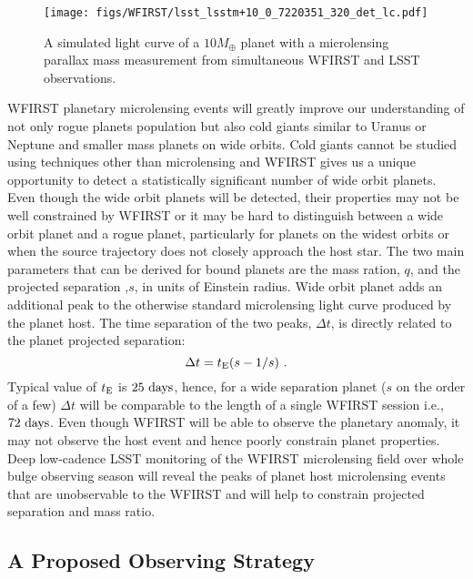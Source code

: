 \begin{figure}[t]
\centering\texttt{[image: figs/WFIRST/lsst\_lsstm+10\_0\_7220351\_320\_det\_lc.pdf]}
\caption{A simulated light curve of a $10 M_{\oplus}$ planet with a microlensing parallax
mass measurement from simultaneous WFIRST and LSST observations.
\label{fig-lc}}
\end{figure}

WFIRST planetary microlensing events will greatly improve our
understanding of not only rogue planets population but also cold giants similar to
Uranus or Neptune and smaller mass planets on wide orbits. Cold giants
cannot be studied using techniques other than microlensing and
WFIRST gives us a unique opportunity to detect a statistically significant
number of wide orbit planets. Even though the wide orbit planets will be detected,
their properties may not be well constrained by WFIRST or it may be hard to distinguish
between a wide orbit planet and a rogue planet, particularly for planets on the widest
orbits or when the source trajectory does not closely approach the host star.
The two main parameters that can be derived for bound planets are
the mass ration, $q$, and the projected separation ,$s$, in units of Einstein radius.
Wide orbit planet adds an additional peak to the otherwise
standard microlensing light curve produced by the planet host.
The time separation of the two peaks, $\Delta t$, is directly related
to the planet projected separation:
\begin{equation}
 \Delta t =  t_{\rm E}(s - {1/s}) \ .
\end{equation}
Typical value of $t_{\rm E}$ is $25~{\rm days}$, hence, for a wide
separation planet ($s$ on the order of a few) $\Delta t$ will be
comparable to the length of a single WFIRST session i.e., $72~{\rm days}$.
Even though WFIRST will be able to observe the planetary anomaly,
it may not observe the host event and hence poorly constrain planet properties. Deep low-cadence LSST
monitoring of the WFIRST microlensing field over whole bulge observing season
will reveal the peaks of planet host microlensing events that are unobservable
to the WFIRST and will help to constrain projected separation and mass ratio.



\subsection{A Proposed Observing Strategy}
\label{sec:\secname:proposal}

